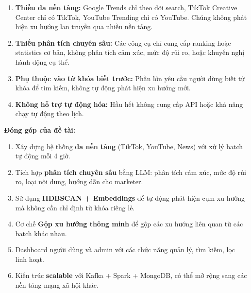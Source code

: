 \begin{enumerate}
    \item \textbf{Thiếu đa nền tảng:} Google Trends chỉ theo dõi search, TikTok Creative Center chỉ có TikTok, YouTube Trending chỉ có YouTube. Chúng không phát hiện xu hướng lan truyền qua nhiều nền tảng.

    \item \textbf{Thiếu phân tích chuyên sâu:} Các công cụ chỉ cung cấp ranking hoặc statistics cơ bản, không phân tích cảm xúc, mức độ rủi ro, hoặc khuyến nghị hành động cụ thể.

    \item \textbf{Phụ thuộc vào từ khóa biết trước:} Phần lớn yêu cầu người dùng biết từ khóa để tìm kiếm, không tự động phát hiện xu hướng mới.

    \item \textbf{Không hỗ trợ tự động hóa:} Hầu hết không cung cấp API hoặc khả năng chạy tự động theo lịch.
\end{enumerate}

\textbf{Đóng góp của đề tài:}

\begin{enumerate}
    \item Xây dựng hệ thống \textbf{đa nền tảng} (TikTok, YouTube, News) với xử lý batch tự động mỗi 4 giờ.

    \item Tích hợp \textbf{phân tích chuyên sâu} bằng LLM: phân tích cảm xúc, mức độ rủi ro, loại nội dung, hướng dẫn cho marketer.

    \item Sử dụng \textbf{HDBSCAN + Embeddings} để tự động phát hiện cụm xu hướng mà không cần chỉ định từ khóa riêng lẻ.

    \item Cơ chế \textbf{Gộp xu hướng thông minh} để gộp các xu hướng liên quan từ các batch khác nhau.

    \item Dashboard người dùng và admin với các chức năng quản lý, tìm kiếm, lọc linh hoạt.

    \item Kiến trúc \textbf{scalable} với Kafka + Spark + MongoDB, có thể mở rộng sang các nền tảng mạng xã hội khác.
\end{enumerate}

